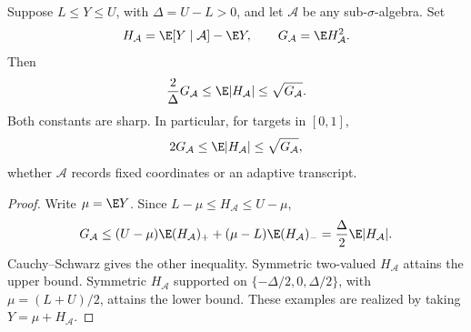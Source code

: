\begin{lemma}\label{ian:adaptive-posterior-moments}
Suppose \(L\le Y\le U\), with \(\Delta=U-L>0\), and let \(\mathcal A\) be any sub-\(\sigma\)-algebra. Set
\[
 H_{\mathcal A}=\E[Y\mid\mathcal A]-\E Y,
 \qquad G_{\mathcal A}=\E H_{\mathcal A}^2.
\]
Then
\[
 \frac{2}{\Delta}G_{\mathcal A}
 \le \E|H_{\mathcal A}|
 \le \sqrt{G_{\mathcal A}}.
\]
Both constants are sharp. In particular, for targets in \([0,1]\),
\[
 2G_{\mathcal A}\le\E|H_{\mathcal A}|\le\sqrt{G_{\mathcal A}},
\]
whether \(\mathcal A\) records fixed coordinates or an adaptive transcript.
\end{lemma}
\begin{proof}
Write \(\mu=\E Y\). Since \(L-\mu\le H_{\mathcal A}\le U-\mu\),
\[
 G_{\mathcal A}
 \le (U-\mu)\E(H_{\mathcal A})_+
       +(\mu-L)\E(H_{\mathcal A})_-
 =\frac{\Delta}{2}\E|H_{\mathcal A}|.
\]
Cauchy--Schwarz gives the other inequality. Symmetric two-valued \(H_{\mathcal A}\) attains the upper bound. Symmetric \(H_{\mathcal A}\) supported on
\(\{-\Delta/2,0,\Delta/2\}\), with \(\mu=(L+U)/2\), attains the lower bound. These examples are realized by taking \(Y=\mu+H_{\mathcal A}\).
\end{proof}

